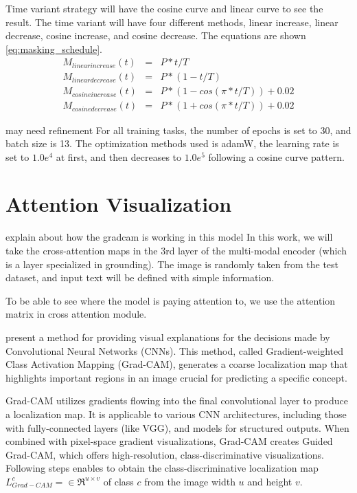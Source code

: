 Time variant strategy will have the cosine curve and linear curve to see the result. The time variant will have four different methods, linear increase, linear decrease, cosine increase, and cosine decrease. The equations are shown \ref{eq:masking_schedule}. 
\begin{eqnarray}
M_{linear increase}\left( t \right) &=& P*t/T \\
M_{linear decrease}\left( t \right) &=& P*\left(1-t/T\right) \\
M_{cosine increase}\left(t\right) &=& P*\left(1-cos\left(\pi*t/T\right)\right) + 0.02 \\
M_{cosine decrease}\left(t\right) &=& P*\left(1+cos\left(\pi*t/T\right)\right) + 0.02 
\label{eq:masking_schedule}
\end{eqnarray}


{\color{red} may need refinement}
For all training tasks, the number of epochs is set to 30, and batch size is 13. The optimization methods used is adamW, the learning rate is set to $1.0e^4$ at first, and then decreases to $1.0e^5$ following a cosine curve pattern.


\section{Attention Visualization}

{\color{red} explain about how the gradcam is working in this model}
In this work, we will take the cross-attention maps in the 3rd layer of the multi-modal encoder (which is a layer specialized in grounding). The image is randomly taken from the test dataset, and input text will be defined with simple information.

To be able to see where the model is paying attention to, we use the attention matrix in cross attention module. 

\cite{gradcam} present a method for providing visual explanations for the decisions made by Convolutional Neural Networks (CNNs). This method, called Gradient-weighted Class Activation Mapping (Grad-CAM), generates a coarse localization map that highlights important regions in an image crucial for predicting a specific concept.

Grad-CAM utilizes gradients flowing into the final convolutional layer to produce a localization map. It is applicable to various CNN architectures, including those with fully-connected layers (like VGG), and models for structured outputs. When combined with pixel-space gradient visualizations, Grad-CAM creates Guided Grad-CAM, which offers high-resolution, class-discriminative visualizations.
Following steps enables to obtain the class-discriminative localization map $L^c_{Grad-CAM} = \in\Re^{u \times v}$ of class $c$ from the image width $u$ and height $v$. 

